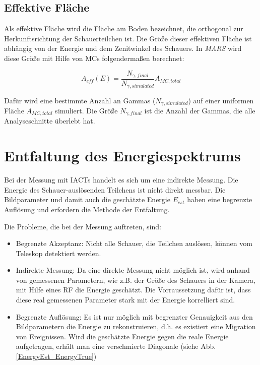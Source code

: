 \subsection{Effektive Fläche}
Als effektive Fläche wird die Fläche am Boden bezeichnet, die orthogonal zur Herkunftsrichtung der Schauerteilchen ist.
Die Größe dieser effektiven Fläche ist abhängig von der Energie und dem Zenitwinkel des Schauers.
In \textit{MARS} wird diese Größe mit Hilfe von MCs folgendermaßen berechnet:

\begin{equation}
 A_{eff}(E)=\frac{N_{\gamma, final}}{N_{\gamma, simulated}}A_{MC, total}
\end{equation}

Dafür wird eine bestimmte Anzahl an Gammas ($N_{\gamma, simulated}$) auf einer uniformen Fläche $A_{MC,total}$ simuliert. 
Die Größe $N_{\gamma, final}$ ist die Anzahl der Gammas, die alle Analyseschnitte überlebt hat.


\section{Entfaltung des Energiespektrums}
\label{sec:Unfolding}
Bei der Messung mit IACTs handelt es sich um eine indirekte Messung.
Die Energie des Schauer-auslösenden Teilchens ist nicht direkt messbar.
Die Bildparameter und damit auch die geschätzte Energie $E_{est}$ haben eine begrenzte Auflösung und erfordern die Methode der Entfaltung.

Die Probleme, die bei der Messung auftreten, sind:

\begin{itemize}
 \item Begrenzte Akzeptanz: Nicht alle Schauer, die Teilchen auslösen, können vom Teleskop detektiert werden.
 \item Indirekte Messung: Da eine direkte Messung nicht möglich ist, wird anhand von gemessenen Parametern, wie z.B. der Größe des Schauers in der Kamera, mit Hilfe eines RF die Energie geschätzt.
       Die Vorraussetzung dafür ist, dass diese real gemessenen Parameter stark mit der Energie korrelliert sind.
 \item Begrenzte Auflösung: Es ist nur möglich mit begrenzter Genauigkeit aus den Bildparametern die Energie zu rekonstruieren, d.h. es existiert eine Migration von Ereignissen.
       Wird die geschätzte Energie gegen die reale Energie aufgetragen, erhält man eine verschmierte Diagonale (siehe Abb.\ref{EnergyEst_EnergyTrue})
\end{itemize}

